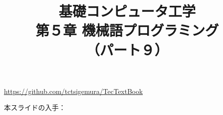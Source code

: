 \documentclass[handout]{beamer}        %
\begin{document}
\title{基礎コンピュータ工学\\第５章 機械語プログラミング\\（パート９）}
\date{}

\begin{frame}
  \titlepage
  \centerline{\url{https://github.com/tctsigemura/TecTextBook}}
  \vfill
  \centerline{本スライドの入手：
    }
\end{frame}

\end{document}
